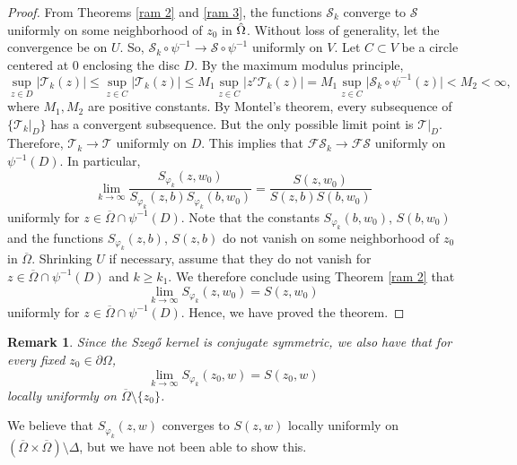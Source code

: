 \documentclass[11pt, reqno]{amsart}
\newtheorem{rem}[thm]{Remark}
\numberwithin{equation}{section}
\begin{document}
\begin{proof}
\medskip

From Theorems \ref{ram 2} and \ref{ram 3}, the functions $\mathcal{S}_k$ converge to $\mathcal{S}$ uniformly on some neighborhood of $z_0$ in $\Hat{\Omega}$. Without loss of generality, let the convergence be on $U$. So, $\mathcal{S}_k\circ \psi^{-1}\rightarrow\mathcal{S}\circ\psi^{-1}$ uniformly on $V$. Let $C\subset V$ be a circle centered at $0$ enclosing the disc $D$. By the maximum modulus principle, 
\[
\sup_{z\in D}\vert \mathcal{T}_k(z)\vert \leq \sup_{z\in C}\vert \mathcal{T}_k(z)\vert \leq M_1 \sup_{z\in C}\vert z^r\mathcal{T}_k(z)\vert 
=  M_1 \sup_{z\in C}\vert \mathcal{S}_k\circ\psi^{-1}(z)\vert <M_2<\infty,
\]
where $M_1, M_2$ are positive constants. By Montel's theorem, every subsequence of $\{\mathcal{T}_k\vert_D\}$ has a convergent subsequence. But the only possible limit point is $\mathcal{T}\vert_D$. Therefore, $\mathcal{T}_k\rightarrow\mathcal{T}$ uniformly on $D$. This implies that $\mathcal{F}\mathcal{S}_k\rightarrow\mathcal{F}\mathcal{S}$ uniformly on $\psi^{-1}(D)$. In particular,
\[
\lim_{k\rightarrow\infty}\frac{S_{\varphi_k}(z,w_0)}{S_{\varphi_k}(z,b)S_{\varphi_k}(b,w_0)} = \frac{S(z,w_0)}{S(z,b)S(b,w_0)}
\]
uniformly for $z\in \overline{\Omega}\cap \psi^{-1}(D)$. Note that the constants $S_{\varphi_k}(b,w_0)$, $S(b,w_0)$ and the functions $S_{\varphi_k}(z,b)$, $S(z,b)$ do not vanish on some neighborhood of $z_0$ in $\overline{\Omega}$. Shrinking $U$ if necessary, assume that they do not vanish for $z\in \overline{\Omega}\cap \psi^{-1}(D)$ and $k\geq k_1$. We therefore conclude using Theorem \ref{ram 2} that 
\begin{equation}\label{con3}
\lim_{k\rightarrow\infty}S_{\varphi_k}(z,w_0) = S(z,w_0)
\end{equation}
uniformly for $z\in\overline{\Omega}\cap \psi^{-1}(D)$. Hence, we have proved the theorem.
\end{proof}

\begin{rem} 
Since the Szeg\H{o} kernel is conjugate symmetric, we also have that for every fixed $z_0\in\partial\Omega$,
\[
\lim_{k\rightarrow\infty}S_{\varphi_k}(z_0,w) = S(z_0,w)
\]
locally uniformly on $\overline{\Omega}\setminus\{z_0\}$.
\end{rem}

\medskip

We believe that $S_{\varphi_k}(z, w)$ converges to $S(z, w)$ locally uniformly on $(\overline \Omega \times \overline \Omega) \setminus \Delta$, but we have not been able to show this.
\end{document}
